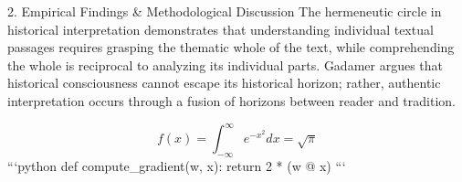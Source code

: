 2. Empirical Findings & Methodological Discussion
The hermeneutic circle in historical interpretation demonstrates that understanding individual textual passages requires grasping the thematic whole of the text, while comprehending the whole is reciprocal to analyzing its individual parts. Gadamer argues that historical consciousness cannot escape its historical horizon; rather, authentic interpretation occurs through a fusion of horizons between reader and tradition.

$$ f(x) = \int_{-\infty}^{\infty} e^{-x^2} dx = \sqrt{\pi} $$ 
```python
def compute_gradient(w, x):
    return 2 * (w @ x)
```